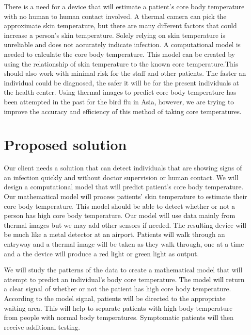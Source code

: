 \documentclass{article}
\begin{document}
\par 
There is a need for a device that will estimate a patient’s core body temperature with no human to human contact involved. A thermal camera can pick the approximate skin temperature, but there are many different factors that could increase a person's skin temperature. Solely relying on skin temperature is unreliable and does not accurately indicate infection. A computational model is needed to calculate the core body temperature. This model can be created by using the relationship of skin temperature to the known core temperature.This should also work with minimal risk for the staff and other patients. The faster an individual could be diagnosed, the safer it will be for the present individuals at the health center. Using thermal images to predict core body temperature has been attempted in the past for the bird flu in Asia, however, we are trying to improve the accuracy and efficiency of this method of taking core temperatures. 
  \par


\section{Proposed solution}
Our client needs a solution that can detect individuals that are showing signs of an infection quickly and without doctor supervision or human contact. We will design a computational model that will predict patient’s core body temperature. Our mathematical model will process patients’ skin temperature to estimate their core body temperature. This model should be able to detect whether or not a person has high core body temperature.  Our model will use data mainly from thermal images but we may add other sensors if needed. The resulting device will be much like a metal detector at an airport. Patients will walk through an entryway and a thermal image will be taken as they walk through, one at a time and a the device will produce a red light or green light as output. 
 \par
We will study the patterns of the data to create a mathematical model that will attempt to predict an individual’s body core temperature. The model will return a clear signal of whether or not the patient has high core body temperature. According to the model signal, patients will be directed to the appropriate waiting area. This will help to separate patients with high body temperature from people with normal body temperatures. Symptomatic patients will then receive additional testing.
\end{document}
